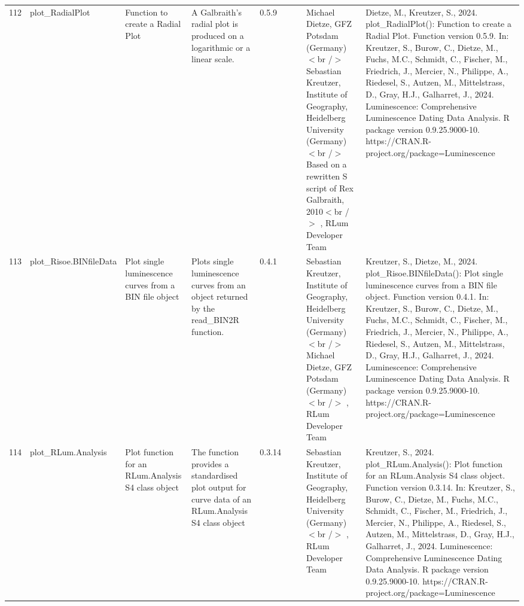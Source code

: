 \begin{table}[ht]
\begin{tabular}{rllllllll}
 \\ 
  112 & plot\_RadialPlot & Function to create a Radial Plot & A Galbraith's radial plot is produced on a logarithmic or a linear scale. & 0.5.9
 &  &  & Michael Dietze, GFZ Potsdam (Germany) $<$br /$>$ Sebastian Kreutzer, Institute of Geography, Heidelberg University (Germany) $<$br /$>$ Based on a rewritten S script of Rex Galbraith, 2010$<$br /$>$ , RLum Developer Team & Dietze, M., Kreutzer, S., 2024. plot\_RadialPlot(): Function to create a Radial Plot. Function version 0.5.9. In: Kreutzer, S., Burow, C., Dietze, M., Fuchs, M.C., Schmidt, C., Fischer, M., Friedrich, J., Mercier, N., Philippe, A., Riedesel, S., Autzen, M., Mittelstrass, D., Gray, H.J., Galharret, J., 2024. Luminescence: Comprehensive Luminescence Dating Data Analysis. R package version 0.9.25.9000-10. https://CRAN.R-project.org/package=Luminescence
 \\ 
  113 & plot\_Risoe.BINfileData & Plot single luminescence curves from a BIN file object & Plots single luminescence curves from an object returned by the read\_BIN2R  function. & 0.4.1
 &  &  & Sebastian Kreutzer, Institute of Geography, Heidelberg University (Germany) $<$br /$>$ Michael Dietze, GFZ Potsdam (Germany)$<$br /$>$ , RLum Developer Team & Kreutzer, S., Dietze, M., 2024. plot\_Risoe.BINfileData(): Plot single luminescence curves from a BIN file object. Function version 0.4.1. In: Kreutzer, S., Burow, C., Dietze, M., Fuchs, M.C., Schmidt, C., Fischer, M., Friedrich, J., Mercier, N., Philippe, A., Riedesel, S., Autzen, M., Mittelstrass, D., Gray, H.J., Galharret, J., 2024. Luminescence: Comprehensive Luminescence Dating Data Analysis. R package version 0.9.25.9000-10. https://CRAN.R-project.org/package=Luminescence
 \\ 
  114 & plot\_RLum.Analysis & Plot function for an RLum.Analysis S4 class object & The function provides a standardised plot output for curve data of an RLum.Analysis S4 class object & 0.3.14
 &  &  & Sebastian Kreutzer, Institute of Geography, Heidelberg University (Germany)$<$br /$>$ , RLum Developer Team & Kreutzer, S., 2024. plot\_RLum.Analysis(): Plot function for an RLum.Analysis S4 class object. Function version 0.3.14. In: Kreutzer, S., Burow, C., Dietze, M., Fuchs, M.C., Schmidt, C., Fischer, M., Friedrich, J., Mercier, N., Philippe, A., Riedesel, S., Autzen, M., Mittelstrass, D., Gray, H.J., Galharret, J., 2024. Luminescence: Comprehensive Luminescence Dating Data Analysis. R package version 0.9.25.9000-10. https://CRAN.R-project.org/package=Luminescence
 \\ 

\end{tabular}
\end{table}
